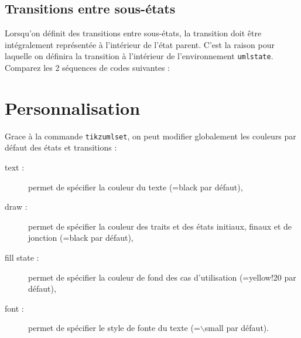 \documentclass[a4paper,11pt]{report}
\newcommand{\inputTikZ}[1]{%
  }%
\newcommand{\inputTikZ}[1]{%
    \texttt{[image: fig/\#1.pdf]}%
  }%
\begin{document}
\subsection{Transitions entre sous-états}\label{ss.substatetrans}

Lorsqu'on définit des transitions entre sous-états, la transition doit être intégralement représentée à l'intérieur de l'état parent. C'est la raison pour laquelle on définira la transition à l'intérieur de l'environnement {\tt umlstate}. Comparez les 2 séquences de codes suivantes :

\medskip

\begin{minipage}{0.51\textwidth}

\end{minipage}
\begin{minipage}{0.49\textwidth}
\begin{center}
\inputTikZ{figure59}
\end{center}
\end{minipage}

\begin{minipage}{0.51\textwidth}

\end{minipage}
\begin{minipage}{0.49\textwidth}
\begin{center}
\inputTikZ{figure60}
\end{center}
\end{minipage}

\section{Personnalisation}\label{s.fitstatetrans}

Grace à la commande {\tt tikzumlset}, on peut modifier globalement les couleurs par défaut des états et transitions :

\begin{description}
\item[text :] permet de spécifier la couleur du texte (=black par défaut),
\item[draw :] permet de spécifier la couleur des traits et des états initiaux, finaux et de jonction (=black par défaut),
\item[fill state :] permet de spécifier la couleur de fond des cas d'utilisation (=yellow!20 par défaut),
\item[font :] permet de spécifier le style de fonte du texte (=$\backslash$small par défaut).
\end{description}
\end{document}
